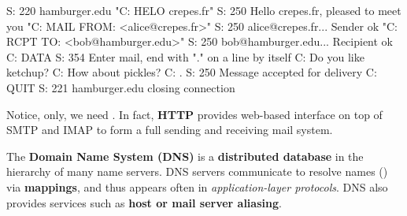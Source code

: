 \documentclass[12pt,a4paper]{article}
\begin{document}

\begin{shuncmd}
S: 220 hamburger.edu
"C: HELO crepes.fr"
S: 250 Hello crepes.fr, pleased to meet you
"C: MAIL FROM: <alice@crepes.fr>"
S: 250 alice@crepes.fr... Sender ok
"C: RCPT TO: <bob@hamburger.edu>"
S: 250 bob@hamburger.edu... Recipient ok
C: DATA
S: 354 Enter mail, end with "." on a line by itself
C: Do you like ketchup?
C: How about pickles?
C: .
S: 250 Message accepted for delivery
C: QUIT
S: 221 hamburger.edu closing connection
\end{shuncmd}




\vspace{1.0em}

\noindent Notice,  only, we need . In fact, \textbf{HTTP} provides web-based interface on top of SMTP and IMAP to form a full sending and receiving mail system.

\vspace{1.0em}

\noindent The \textbf{Domain Name System (DNS)} is a \textbf{distributed database} in the hierarchy of many name servers. DNS servers communicate to resolve names () via \textbf{mappings}, and thus appears often in \textit{application-layer protocols}. DNS also provides services such as \textbf{host or mail server aliasing}. \\
\end{document}
